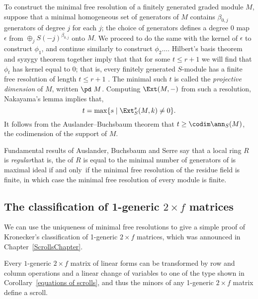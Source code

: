 To construct the minimal free resolution of a finitely generated graded module $M$, suppose that a minimal homogeneous set of generators
of $M$
contains $\beta_{0,j}$ generators of degree $j$ for each $j$; the choice of generators
defines a degree 0 map $\epsilon$
from
$
\oplus_jS(-j)^{\beta_{0,j}}
$
onto $M$. We proceed to do the same with the kernel of $\epsilon$ to construct $\phi_{1}$, and continue similarly to construct $\phi_{2}\dots$.
Hilbert's basis theorem
%
and
syzygy theorem
%
together imply that 
that for some $t\leq r+1$ we will find that $\phi_t$ has
kernel equal to 0; that is,
every finitely
generated $S$-module has a finite free resolution
of length $t\leq r+1$
\cite[Corollary 19.7]{Eisenbud1995}.
The minimal such $t$ is called the \emph{projective dimension} of $M$,
written $\pd\ M$.
%
%
Computing $\Ext(M,-)$ from such a resolution, Nakayama's lemma implies that,
$$
t = \max\{s \mid \Ext_S^s(M,k) \neq 0 \}.
$$
It follows from the Auslander--Buchsbaum
%
theorem \cite[Theorem 19.9]{Eisenbud1995} that $t \geq \codim \ann_S(M)$,
the codimension of the support of $M$.

\begin{fact}
 Fundamental
results of Auslander, Buchsbaum and Serre say that a local ring $R$
%
%
%
is \emph{regular}\emdash that is, the
%
%
of $R$ is equal to the
minimal number
of generators of is maximal ideal \emdash if and only~if the minimal free resolution
of the residue field is finite, in which case
the minimal free resolution of every module is finite.
\end{fact}
 



\subsection*{The classification of 1-generic \texorpdfstring{$2\times f$}{2 x f}
matrices}\label{Kronecker}

We can use the uniqueness of minimal free resolutions to give a simple
proof of Kronecker's classification of 1-generic $2\times f$
%
matrices, which was announced in Chapter~\ref{ScrollsChapter}.

\begin{theorem}\label{matrix pencils}
Every
$1$-generic $2 \times f$ matrix of linear forms can be transformed by
row and column operations and a linear change
of variables to one of the type shown in
Corollary~\ref{equations of scrolls}, and thus the minors of any 1-generic
$2 \times f$ matrix define a scroll.
\unif
\end{theorem}

